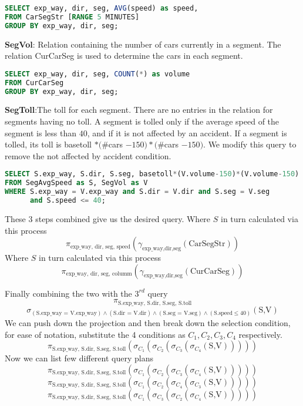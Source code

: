 \begin{lstlisting}[language=SQL]
SELECT exp_way, dir, seg, AVG(speed) as speed,
FROM CarSegStr [RANGE 5 MINUTES]
GROUP BY exp_way, dir, seg;
\end{lstlisting}


\par \textbf{SegVol}: Relation containing the number of cars currently in a segment. The relation CurCarSeg is used to determine the cars in each segment.

\begin{lstlisting}[language=SQL]
SELECT exp_way, dir, seg, COUNT(*) as volume
FROM CurCarSeg
GROUP BY exp_way, dir, seg;
\end{lstlisting}


\par \textbf{SegToll}:The toll for each segment. There are no entries in the relation for segments having no toll. A segment is tolled only if the average speed of the segment is less than $40$, and if it is not affected by an accident. If a segment is tolled, its toll is basetoll $* (\#$cars $- 150) * (\#$cars $- 150)$. We modify this query to remove the not affected by accident  condition.


\begin{lstlisting}[language=SQL]
SELECT S.exp_way, S.dir, S.seg, basetoll*(V.volume-150)*(V.volume-150)
FROM SegAvgSpeed as S, SegVol as V
WHERE S.exp_way = V.exp_way and S.dir = V.dir and S.seg = V.seg
      and S.speed <= 40;
\end{lstlisting}

These 3 steps combined give us the desired query.
Where $S$ in turn calculated via this process
$$\pi_{\text{exp\_way, dir, seg, speed}}(\gamma_{\text{exp\_way,dir,seg}} (\text{CarSegStr}))$$
Where $S$ in turn calculated via this process
$$\pi_{\text{exp\_way, dir, seg, columm}}(\gamma_{\text{exp\_way,dir,seg}} (\text{CurCarSeg}))$$

Finally combining the two with the $3^{rd}$ query 
$$\pi_{\text{S.exp\_way, S.dir, S.seg, S.toll}}$$
$$\sigma_{(\text{S.exp\_way = V.exp\_way}) \land (\text{S.dir = V.dir}) \land (\text{S.seg = V.seg})\land (\text{S.speed} \leq 40)}(\text{S,V})$$
We can push down the projection and then break down the selection condition, for ease of notation, substitute the 4 conditions as $C_1,C_2,C_3,C_4$ respectively.
$$\pi_{\text{S.exp\_way, S.dir, S.seg, S.toll}}(\sigma_{C_1}(\sigma_{C_2}(\sigma_{C_3}(\sigma_{C_4}(\text{S,V})))))$$
Now we can list few different query plans
$$\pi_{\text{S.exp\_way, S.dir, S.seg, S.toll}}(\sigma_{C_1}(\sigma_{C_2}(\sigma_{C_3}(\sigma_{C_4}(\text{S,V})))))$$
$$\pi_{\text{S.exp\_way, S.dir, S.seg, S.toll}}(\sigma_{C_1}(\sigma_{C_2}(\sigma_{C_4}(\sigma_{C_3}(\text{S,V})))))$$
$$\pi_{\text{S.exp\_way, S.dir, S.seg, S.toll}}(\sigma_{C_1}(\sigma_{C_3}(\sigma_{C_2}(\sigma_{C_4}(\text{S,V})))))$$

